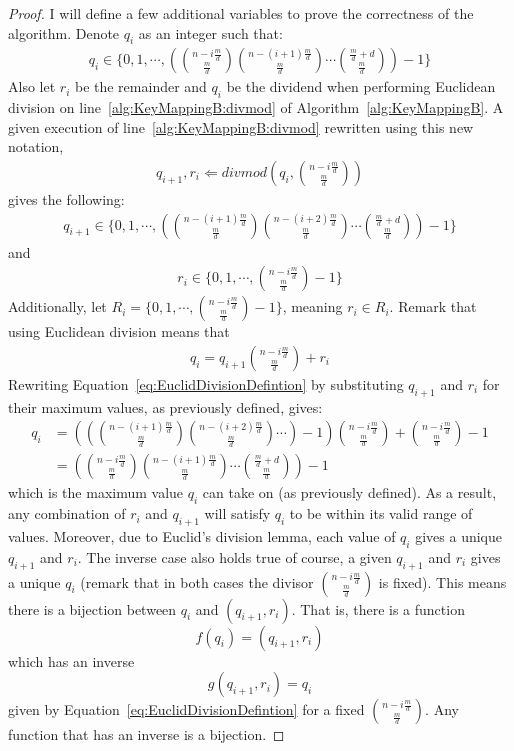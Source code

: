 \begin{proof}
I will define a few additional variables to prove the correctness of the algorithm. Denote $q_i$ as an integer such that:
\begin{align}
q_i \in \{0, 1, \cdots ,\left({n - i\frac{m}{d} \choose \frac{m}{d}}{n - (i+1)\frac{m}{d} \choose \frac{m}{d}}\cdots{\frac{m}{d} + d \choose \frac{m}{d}}\right) - 1 \}
\end{align}
Also let $r_i$ be the remainder and $q_i$ be the dividend when performing Euclidean division on line~\ref{alg:KeyMappingB:divmod} of Algorithm~\ref{alg:KeyMappingB}. A given execution of line~\ref{alg:KeyMappingB:divmod} rewritten using this new notation,
\begin{align}
q_{i+1},r_i \Longleftarrow \mathit{divmod}\left(q_i,{n - i\frac{m}{d} \choose \frac{m}{d}}\right)
\end{align}
gives the following:
\begin{align}
q_{i+1} \in \{0, 1, \cdots ,\left({n - (i+1)\frac{m}{d} \choose \frac{m}{d}}{n - (i+2)\frac{m}{d} \choose \frac{m}{d}}\cdots{\frac{m}{d} + d \choose \frac{m}{d}}\right) - 1 \}
\end{align}
and
\begin{align}
r_i \in \{0, 1, \cdots ,{n - i\frac{m}{d} \choose \frac{m}{d}} - 1\}
\end{align}
Additionally, let $R_i = \{0, 1, \cdots ,{n - i\frac{m}{d} \choose \frac{m}{d}} - 1\}$, meaning $r_i \in R_i$. Remark that using Euclidean division means that
\begin{align}
q_{i} = q_{i+1}{n - i\frac{m}{d} \choose \frac{m}{d}} + r_{i} \label{eq:EuclidDivisionDefintion}
\end{align}
Rewriting Equation~\eqref{eq:EuclidDivisionDefintion} by substituting $q_{i+1}$ and $r_i$ for their maximum values, as previously defined, gives:
\begin{align}
q_{i} &= \left(\left({n - (i+1)\frac{m}{d} \choose \frac{m}{d}}{n - (i+2)\frac{m}{d} \choose \frac{m}{d}}\cdots \right) - 1\right) {n - i\frac{m}{d} \choose \frac{m}{d}} + {n - i\frac{m}{d} \choose \frac{m}{d}} - 1 \\
&= \left({n - i\frac{m}{d} \choose \frac{m}{d}}{n - (i+1)\frac{m}{d} \choose \frac{m}{d}}\cdots{\frac{m}{d} + d \choose \frac{m}{d}}\right) - 1
\end{align}
which is the maximum value $q_i$ can take on (as previously defined). As a result, any combination of $r_i$ and $q_{i+1}$ will satisfy $q_i$ to be within its valid range of values. Moreover, due to Euclid's division lemma, each value of $q_i$ gives a unique $q_{i+1}$ and $r_i$. The inverse case also holds true of course, a given $q_{i+1}$ and $r_i$ gives a unique $q_i$ (remark that in both cases the divisor ${n - i\frac{m}{d} \choose \frac{m}{d}}$ is fixed). This means there is a bijection between $q_{i}$ and $(q_{i+1}, r_i)$. That is, there is a function $$f(q_i) = (q_{i+1}, r_i)$$ which has an inverse $$g(q_{i+1},r_i) = q_i$$ given by Equation~\eqref{eq:EuclidDivisionDefintion} for a fixed ${n - i\frac{m}{d} \choose \frac{m}{d}}$. Any function that has an inverse is a bijection.


\end{proof}
